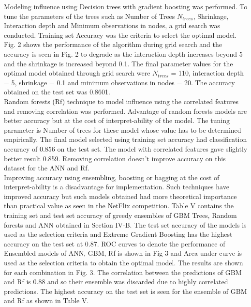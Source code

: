 \documentclass[conference]{IEEEtran}
\begin{document}
Modeling influence using Decision trees with gradient boosting was performed. To tune the parameters of the trees such as Number of Trees $N_{trees}$, Shrinkage, Interaction depth and Minimum observations in nodes, a grid search was conducted. Training set Accuracy was the criteria to select the optimal model. Fig. 2 shows the performance of the algorithm during grid search and the accuracy is seen in Fig. 2 to degrade as the interaction depth increases beyond 5 and the shrinkage is increased beyond 0.1.  The final parameter values for the optimal model obtained through grid search were $N_{trees}$ = 110, interaction depth = 5, shrinkage = 0.1 and minimum observations in nodes = 20. The accuracy obtained on the test set was 0.8601.\\

Random forests (Rf) technique to model influence using the correlated features and removing correlation was performed. Advantage of random forests models are better accuracy but at the cost of interpret-ability of the model. The tuning parameter is Number of trees for these model whose value has to be determined empirically. The final model selected using training set accuracy had classification accuracy of 0.856 on the test set. The model with correlated features gave slightly better result 0.859. Removing correlation doesn’t improve accuracy on this dataset for the ANN and Rf.\\

Improving accuracy using ensembling, boosting or bagging at the cost of interpret-ability is a disadvantage for implementation. Such techniques have improved accuracy but such models obtained had more theoretical importance than practical value as seen in the NetFlix competition. Table V contains the training set and test set accuracy of greedy ensembles of GBM Trees, Random forests and ANN obtained in Section IV-B. The test set accuracy of the models is used as the selection criteria and Extreme Gradient Boosting has the highest accuracy on the test set at 0.87. ROC curves to denote the performance of Ensembled models of ANN, GBM, Rf is shown in Fig 3 and Area under curve is used as the selection criteria to obtain the optimal model. The results are shown for each combination in Fig. 3. The correlation between the predictions of GBM and Rf is 0.88 and so their ensemble was discarded due to highly correlated predictions. The highest accuracy on the test set is seen for the ensemble of GBM and Rf as shown in Table V.  \\
\end{document}
